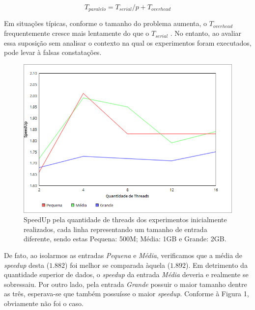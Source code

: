 \documentclass[letterpaper, 10 pt, conference]{ieeeconf}  %
\begin{document}
$$T_{paralelo} = T_{serial}/p + T_{overhead}$$

Em situações típicas, conforme o tamanho do problema aumenta, o $T_{overhead}$ frequentemente cresce mais lentamente do que o $T_{serial}$ \cite{c1}. No entanto, ao avaliar essa suposição sem analisar o contexto na qual os experimentos foram executados, pode levar à falsas constatações. 


\begin{figure}[thpb]
      \centering
      \includegraphics[scale=0.35]{speedup.png}
      \caption{SpeedUp pela quantidade de threads dos experimentos inicialmente realizados, cada linha representando um tamanho de entrada diferente, sendo estas Pequena: 500M; Média: 1GB e Grande: 2GB.}
      \label{figurelabel}
   \end{figure}
De fato, ao isolarmos as entradas \textit{Pequena} e \textit{Média}, verificamos que a média de \textit{speedup} desta ($1.882$) foi melhor se comparada àquela ($1.892$). Em detrimento da quantidade superior de dados, o \textit{speedup} da entrada \textit{Média} deveria e realmente se sobressaiu. Por outro lado, pela entrada \textit{Grande} possuir o maior tamanho dentre as três, esperava-se que também possuísse o maior \textit{speedup}. Conforme à Figura 1, obviamente não foi o caso.
\end{document}
